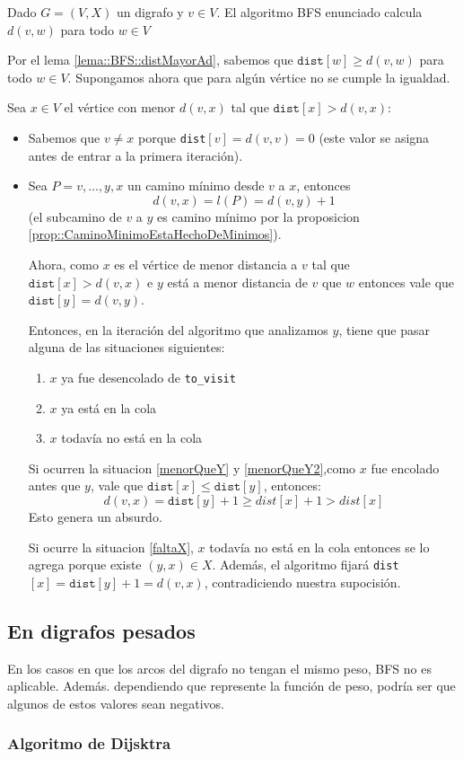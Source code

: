 \begin{theorem}
  Dado \(G=(V,X)\) un digrafo y \(v\in V\). El algoritmo BFS enunciado calcula \(d(v,w)\) para todo \(w\in V\)
\end{theorem}
\begin{demo}
  Por el lema \ref{lema::BFS::distMayorAd}, sabemos que \(\texttt{dist}[w]\geq d(v,w)\) para todo \(w\in V\). Supongamos ahora que para algún vértice no se cumple la igualdad.

  Sea \(x\in V\) el vértice con menor \(d(v,x)\) tal que \(\texttt{dist}[x] > d(v,x)\):
  \begin{itemize}
    \item Sabemos que \(v \neq x\) porque \texttt{dist}\([v] = d(v,v) = 0\) (este valor se asigna antes de entrar a la primera iteración).
    \item Sea \(P = v,\dots,y,x \) un camino mínimo desde \(v\) a \(x\), entonces
          \[d(v,x) = l(P) = d(v,y) + 1 \] (el subcamino de \(v\) a \(y\) es camino mínimo por la proposicion \ref{prop::CaminoMinimoEstaHechoDeMinimos}).

          Ahora, como \(x\) es el vértice de menor distancia a \(v\) tal que \(\texttt{dist}[x] > d(v,x)\) e \(y\) está a menor distancia de \(v\) que \(w\) entonces vale que \(\texttt{dist}[y] = d(v,y)\).

          Entonces, en la iteración del algoritmo que analizamos \(y\), tiene que pasar alguna de las situaciones siguientes:
          \begin{enumerate}
            \item \(x\) ya fue desencolado de \texttt{to\_visit}\label{menorQueY}
            \item \(x\) ya está en la cola\label{menorQueY2}
            \item \(x\) todavía no está en la cola \label{faltaX}
          \end{enumerate}

          Si ocurren la situacion \ref*{menorQueY} y \ref*{menorQueY2},como \(x\) fue encolado antes que \(y\), vale que \(\texttt{dist}[x] \leq \texttt{dist}[y] \), entonces:
          \[ d(v,x) = \texttt{dist}[y] + 1 \geq dist[x] + 1 > dist[x]\]
          Esto genera un absurdo.

          Si ocurre la situacion \ref*{faltaX}, \(x\) todavía no está en la cola entonces se lo agrega porque existe \((y,x) \in X\). Además, el algoritmo fijará \texttt{dist}\([x] = \texttt{dist}[y] + 1 = d(v,x)\), contradiciendo nuestra supocisión.
  \end{itemize}
\end{demo}

\subsection{En digrafos pesados}
En los casos en que los arcos del digrafo no tengan el mismo peso, BFS no es aplicable. Además. dependiendo que represente la función de peso, podría ser que algunos de estos valores sean negativos.

\subsubsection{Algoritmo de Dijsktra}